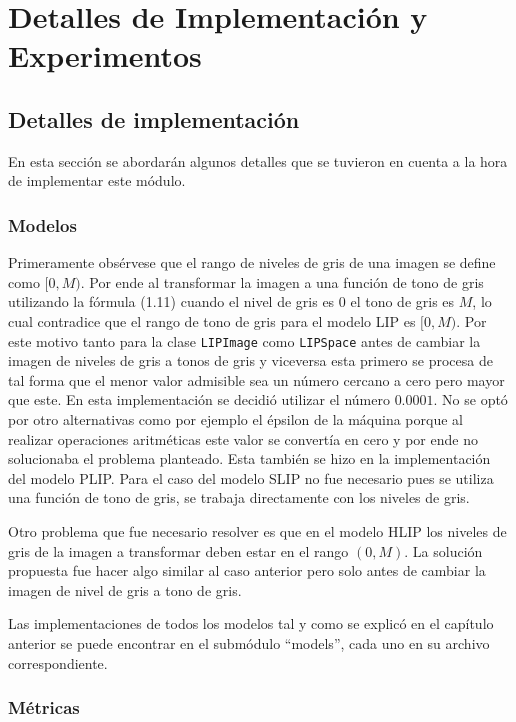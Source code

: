 \chapter{Detalles de Implementación y Experimentos}\label{chapter:implementation}

\section{Detalles de implementaci\'on}

En esta secci\'on se abordar\'an algunos detalles que se tuvieron en cuenta a la hora de implementar este m\'odulo.

\subsection{Modelos}

Primeramente obs\'ervese que el rango de niveles de gris de una imagen se define como $[0,M)$. Por ende al transformar la imagen a una funci\'on de tono de gris utilizando la f\'ormula (1.11) cuando el nivel de gris es 0 el tono de gris es $M$, lo cual contradice que el rango de tono de gris para el modelo LIP es $[0,M)$. Por este motivo tanto para la clase \verb|LIPImage| como \verb|LIPSpace| antes de cambiar la imagen de niveles de gris a tonos de gris y viceversa esta primero se procesa de tal forma que el menor valor admisible sea un n\'umero cercano a cero pero mayor que este. En esta implementaci\'on se decidi\'o utilizar el n\'umero $0.0001$. No se opt\'o por otro alternativas como por ejemplo el \'epsilon de la m\'aquina porque al realizar operaciones aritm\'eticas este valor se convert\'ia en cero y por ende no solucionaba el problema planteado. Esta tambi\'en se hizo en la implementaci\'on del modelo PLIP. Para el caso del modelo SLIP no fue necesario pues se utiliza una funci\'on de tono de gris, se trabaja directamente con los niveles de gris.

Otro problema que fue necesario resolver es que en el modelo HLIP los niveles de gris de la imagen a transformar deben estar en el rango $(0,M)$. La soluci\'on propuesta fue hacer algo similar al caso anterior pero solo antes de cambiar la imagen de nivel de gris a tono de gris.

Las implementaciones de todos los modelos tal y como se explic\'o en el cap\'itulo anterior se puede encontrar en el subm\'odulo ``models'', cada uno en su archivo correspondiente.

\subsection{M\'etricas}

